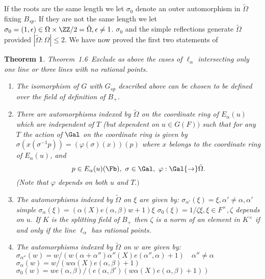 \documentclass{memo-l}
\newtheorem{theorem}{Theorem}[section]
\theoremstyle{definition}
\theoremstyle{remark}
\numberwithin{section}{chapter}
\numberwithin{equation}{chapter}
\begin{document}
   If the roots are the same length we let ${\sigma}_{0}$ denote an outer
automorphism in $\tilde{\Omega}$ fixing $B_{sp}$.  If they are not the same
length we let ${\sigma}_{0}  =  (1,{\epsilon})  \in  {\Omega} \times 
{\ZZ}/2  =  \tilde{\Omega} , {\epsilon} \ne 1$.  ${\sigma}_{0}$ and the simple
reflections generate $\tilde{\Omega}$ provided $|\tilde\Omega:\Omega|\le2$. 
We have now proved the first two
statements of

\medpagebreak

\begin{theorem}{Theorem\ 1.6}\ Exclude as above the cases of
${\ell}_{{\alpha}}$ intersecting only one line or three lines with no
rational points.
 
\medpagebreak
\begin{enumerate}[label=\alph*)]
\item The isomorphism of $G$ with $G_{sp}$ described above can be chosen to be
defined over the field of definition of $B_{+}$.
\medpagebreak
\item There are automorphisms indexed by $\tilde{\Omega}$ 
on the coordinate ring of
$E_{{\alpha}}(u)$ which are independent of $T$ (but dependent on $u  \in 
G(F))$ such that for any $T$ the action of $\Gal$ on the
coordinate ring is given by ${\sigma}(x({\sigma}^{-1}p))  = 
({\varphi}({\sigma})(x))(p)$ where $x$ belongs to the coordinate ring
of $E_{{\alpha}}(u)$, and $$p  \in  E_{{\alpha}}(u)(\Fb), \
{\sigma}  \in 
\Gal,\ {\varphi}: \Gal {\to} \tilde{\Omega} .$$ (Note that
${\varphi}$ depends on both $u$ and $T.)$
\medpagebreak
\item The automorphisms indexed by $\tilde{\Omega}$ on ${\xi}$ are given by:
 \newline
${\sigma}_{{\alpha}'}({\xi})  =  {\xi}, {\alpha}'  \ne {\alpha}, {\alpha}'$
simple						  
 \newline
${\sigma}_{{\alpha}}({\xi})  =  ({\alpha}(X)e({\alpha},{\beta})w+1){\xi}$
 \newline
${\sigma}_{0}({\xi})  =  1/{\zeta}{\xi}, {\xi}  \in  F^{\times}, {\zeta}$
depends on $u$.  If $K$ is the splitting field of $B_{+}$ then ${\zeta}$ is
a norm of an element in $K^{\times}$ if and only if the line ${\ell}_{{\alpha}}$
has rational points.
\medpagebreak
\item The automorphisms indexed by $\tilde{\Omega}$ on $w$ are given by:
 \newline
${\sigma}_{{\alpha}''}(w)  = 
w/(w({\alpha}+{\alpha}''){\alpha}''(X)e({\alpha}'',{\alpha})+1) \quad
{\alpha}''  \ne
{\alpha}$
 \newline
${\sigma}_{{\alpha}}(w)  =  w/(w{\alpha}(X)e({\alpha},{\beta})+1)$
 \newline
${\sigma}_{0}(w)  = 
we({\alpha},{\beta})/(e({\alpha},{\beta}')(w{\alpha}(X)e({\alpha},{\beta})+1))$
\end{enumerate}
\end{theorem}
\end{document}
